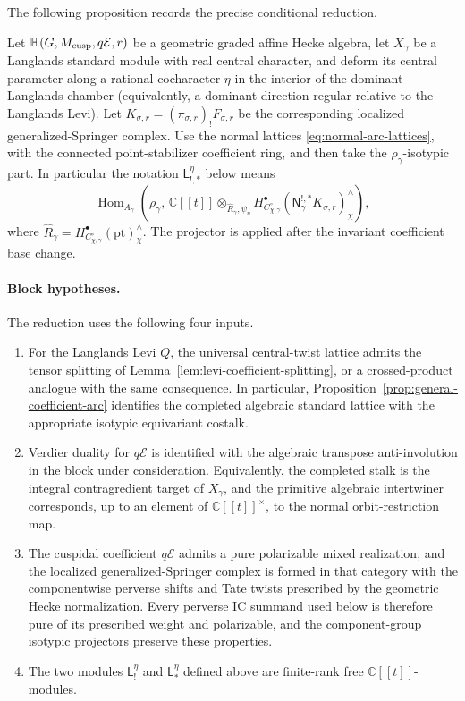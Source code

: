 \documentclass[11pt]{amsart}
\theoremstyle{definition}
\theoremstyle{remark}
\begin{document}
The following proposition records the precise conditional reduction.

Let $\mathbb H(G,M_{\rm cusp},q\mathcal E,r)$ be a geometric graded affine
Hecke algebra, let $X_\gamma$ be a Langlands standard module with real central
character, and deform its central parameter along a rational cocharacter
$\eta$ in the interior of the dominant Langlands chamber (equivalently, a
dominant direction regular relative to the Langlands Levi).  Let
$K_{\sigma,r}=(\pi_{\sigma,r})_!F_{\sigma,r}$ be the corresponding localized
generalized-Springer complex.  Use the normal lattices \eqref{eq:normal-arc-lattices}, with the
connected point-stabilizer coefficient ring, and then take the
$\rho_\gamma$-isotypic part.  In particular the notation
$\mathsf L_{!,*}^{\eta}$ below means
\[
 \operatorname{Hom}_{A_\gamma}\!\left(\rho_\gamma,\,
 \mathbb C[[t]]\otimes_{\widehat R_\gamma,\psi_\eta}
 H_{C_{\chi,\gamma}^\circ}^{\bullet}
       (\mathsf N_\gamma^{!,*}K_{\sigma,r})^\wedge_\chi\right),
\]
where $\widehat R_\gamma
=H_{C_{\chi,\gamma}^\circ}^{\bullet}(\mathrm{pt})^\wedge_\chi$.
The projector is applied after the invariant coefficient base change.

\paragraph{Block hypotheses.}
The reduction uses the following four inputs.
\begin{enumerate}[leftmargin=3.2em]
\item[\textup{(U1)}] For the Langlands Levi $Q$, the universal central-twist lattice admits
the tensor splitting of Lemma~\ref{lem:levi-coefficient-splitting}, or a
crossed-product analogue with the same consequence.  In particular,
Proposition~\ref{prop:general-coefficient-arc} identifies the completed
algebraic standard lattice with the appropriate isotypic equivariant
costalk.
\item[\textup{(U2)}] Verdier duality for $q\mathcal E$ is identified with the algebraic
transpose anti-involution in the block under consideration.  Equivalently,
the completed stalk is the integral contragredient target of $X_\gamma$, and
the primitive algebraic intertwiner corresponds, up to an element of
$\mathbb C[[t]]^\times$, to the normal orbit-restriction map.
\item[\textup{(U3a)}] The cuspidal coefficient $q\mathcal E$ admits a pure
polarizable mixed realization, and the localized generalized-Springer
complex is formed in that category with the componentwise perverse shifts and
Tate twists prescribed by the geometric Hecke normalization.  Every
perverse IC summand used below is therefore pure of its prescribed weight
and polarizable, and the component-group isotypic projectors preserve these
properties.
\item[\textup{(U3b)}] The two modules $\mathsf L_!^\eta$ and
$\mathsf L_*^\eta$ defined above are finite-rank free
$\mathbb C[[t]]$-modules.
\end{enumerate}
\end{document}
